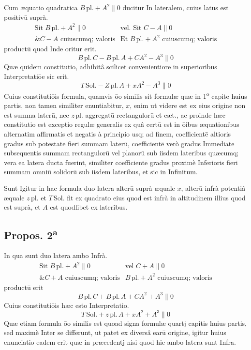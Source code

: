 \documentclass[11pt,a4paper]{article}
\begin{document}
Cum æquatio quadratica $B\,\mathrm{pl.} + A^{2} \parallel 0$ ducitur In lateralem, cuius latus est positivū suprà.
\[ \begin{array}{ll} \text{Sit } B\,\mathrm{pl.} + A^{2} \parallel 0 & \text{vel. Sit } C - A \parallel 0 \\ \text{\& } C - A \text{ cuiuscumq; valoris} & \text{Et } B\,\mathrm{pl.} + A^{2} \text{ cuiuscumq; valoris} \end{array} \]
productū quod Inde oritur erit.
\[ B\,\mathrm{pl.}\,C - B\,\mathrm{pl.}\,A + CA^{2} - A^{3} \parallel 0 \]
Quæ quidem constitutio, adhibitâ scilicet convenientiore in superioribus Interpretatiōe sic erit.
\[ T\,\mathrm{Sol.} - Z\,\mathrm{pl.}\,A + xA^{2} - A^{3} \parallel 0 \]
Cuius constitutiōis formula, quamvis ōo similis sit formulæ quæ in 1\textsuperscript{o} capite huius partis, non tamen similiter enuntiabitur, $x$, enim ut videre est ex eius origine non est summa laterū, nec $z\,\mathrm{pl.}$ aggregatū rectangulorū et cæt., ac proinde hæc constitutio est exceptio regulæ generalis ex quâ certū est in ōibus æquationibus alternatim affirmatis et negatis à principio usq; ad finem, coefficientē altioris gradus sub potestate fieri summam laterū, coefficientē verò gradus Immediate subsequentis summam rectangulorū vel planorū sub iisdem lateribus quæcumq; vera ea latera ducta fuerint, similiter coefficientē gradus proximè Inferioris fieri summam omniū solidorū sub iisdem lateribus, et sic in Infinitum.

Sunt Igitur in hac formula duo latera alterū suprà æquale $x$, alterū infrà potentiâ æquale $z\,\mathrm{pl.}$ et $T\,\mathrm{Sol.}$ fit ex quadrato eius quod est infrà in altitudinem illius quod est suprà, et $A$ est quodlibet ex lateribus.

\subsection*{Propos. 2\textsuperscript{a}}

In qua sunt duo latera ambo Infrà.
\[ \begin{array}{ll} \text{Sit } B\,\mathrm{pl.} + A^{2} \parallel 0 & \text{vel } C + A \parallel 0 \\ \text{\& } C + A \text{ cuiuscumq; valoris} & B\,\mathrm{pl.} + A^{2} \text{ cuiuscumq; valoris} \end{array} \]
productū erit
\[ B\,\mathrm{pl.}\,C + B\,\mathrm{pl.}\,A + CA^{2} + A^{3} \parallel 0 \]
Cuius constitutiōis hæc esto Interpretatio.
\[ T\,\mathrm{Sol.} + z\,\mathrm{pl.}\,A + xA^{2} + A^{3} \parallel 0 \]
Quæ etiam formula ōo similis est quoad signa formulæ quartj capitis huius partis, sed maximè Inter se differunt, ut patet ex diversâ earū origine, igitur huius enunciatio eadem erit quæ in præcedentj nisi quod hic ambo latera sunt Infra.
\end{document}
